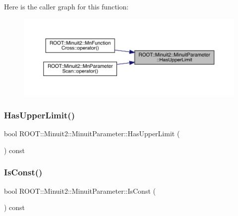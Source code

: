 Here is the caller graph for this function\+:\nopagebreak
\begin{figure}[H]
\begin{center}
\leavevmode
\includegraphics[width=350pt]{dd/dfb/classROOT_1_1Minuit2_1_1MinuitParameter_a821e242fbbf23461e3b66a59126f3f02_icgraph}
\end{center}
\end{figure}
\mbox{\label{classROOT_1_1Minuit2_1_1MinuitParameter_a821e242fbbf23461e3b66a59126f3f02}} 
\subsubsection{\texorpdfstring{HasUpperLimit()}{HasUpperLimit()}\hspace{0.1cm}{\footnotesize\ttfamily [2/2]}}
{\footnotesize\ttfamily bool R\+O\+O\+T\+::\+Minuit2\+::\+Minuit\+Parameter\+::\+Has\+Upper\+Limit (\begin{DoxyParamCaption}{ }\end{DoxyParamCaption}) const\hspace{0.3cm}{\ttfamily [inline]}}

\mbox{\label{classROOT_1_1Minuit2_1_1MinuitParameter_afa82fc56a19c43531f469efc1fa34c2c}} 
\subsubsection{\texorpdfstring{IsConst()}{IsConst()}\hspace{0.1cm}{\footnotesize\ttfamily [1/2]}}
{\footnotesize\ttfamily bool R\+O\+O\+T\+::\+Minuit2\+::\+Minuit\+Parameter\+::\+Is\+Const (\begin{DoxyParamCaption}{ }\end{DoxyParamCaption}) const\hspace{0.3cm}{\ttfamily [inline]}}


